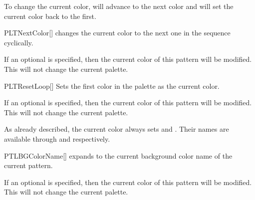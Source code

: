 \documentclass[a4paper, 11pt]{article}
\begin{document}
To change the current color,  will advance to the next color and  will set the current color back to the first.

\begin{macro}{PLTNextColor}[]
     changes the current color to the next one in the sequence cyclically.

    If an optional  is specified, then the current color of this pattern will be modified. This will not change the current palette.
\end{macro}

\begin{macro}{PLTResetLoop}[]
    Sets the first color in the palette as the current color.

    If an optional  is specified, then the current color of this pattern will be modified. This will not change the current palette.
\end{macro}

\begin{example}{}


\end{example}


As already described, the current color always sets  and . Their names are available through  and  respectively.

\begin{macro}{PTLBGColorName}[]
     expands to the current background color name of the current pattern.

    If an optional  is specified, then the current color of this pattern will be modified. This will not change the current palette.
\end{macro}
\end{document}
